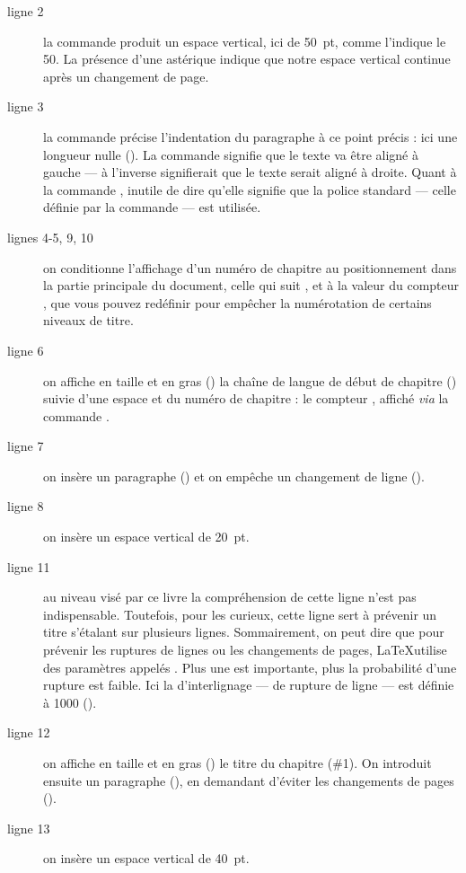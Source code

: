 \begin{description}
\item[ligne 2]la commande   produit un espace vertical, ici de 50~pt, comme l'indique le 50. La présence d'une astérique indique que notre espace vertical continue après un changement de page.
\item[ligne 3]la commande  précise l'indentation du paragraphe à ce point précis : ici une longueur nulle (). La commande  signifie que le texte va être aligné à gauche --- à l'inverse  signifierait que le texte serait aligné à droite. Quant à la commande , inutile de dire qu'elle signifie que la police standard --- celle définie par la commande  --- est utilisée.
\item[lignes 4-5, 9, 10]on conditionne l'affichage d'un numéro de chapitre au positionnement dans la partie principale du document, celle qui suit , et à la valeur du compteur , que vous pouvez redéfinir pour empêcher la numérotation de certains niveaux de titre.
\item[ligne 6]on affiche en taille  et en gras () la chaîne de langue de début de chapitre () suivie d'une espace et du numéro de chapitre : le compteur , affiché \emph{via} la commande .
\item[ligne 7]on insère un paragraphe () et on empêche un changement de ligne ().
\item[ligne 8]on insère un espace vertical de 20~pt.
\item[ligne 11]au niveau visé par ce livre la compréhension de cette ligne n'est pas indispensable. Toutefois, pour les curieux, cette ligne sert à prévenir un titre s'étalant sur plusieurs lignes. Sommairement, on peut dire que pour prévenir les ruptures de lignes ou les changements de pages, \LaTeX utilise des paramètres appelés . Plus une  est importante, plus la probabilité d'une rupture est faible. Ici la  d'interlignage --- de rupture de ligne --- est définie à 1000 ().
\item[ligne 12]on affiche en taille  et en gras () le titre du chapitre (\#1). On introduit ensuite un paragraphe (), en demandant d'éviter les changements de pages ().
\item[ligne 13]on insère un espace vertical de 40~pt.
\end{description}

